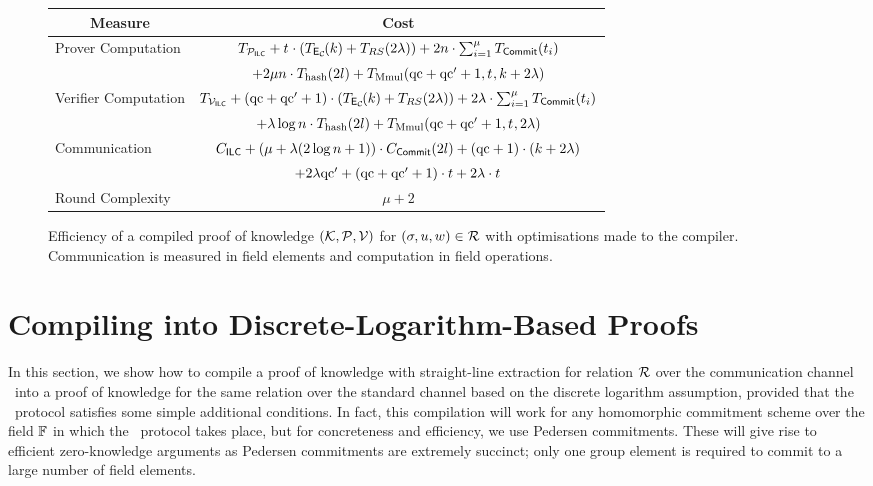 \begin{figure}[!h]
\begin{tabular}{|l|c|}
\hline
\multicolumn{1}{|c|}{\bf Measure} & {\bf Cost} \\
\hline
Prover Computation & $T_{\mathcal{P}_{\mathsf{ILC}}} + {t_{}} \cdot (T_{\mathsf{E}_{\mathcal{C}}\!}(k) + T_{RS}(2\lambda)) + 2n\cdot \sum_{i=1}^{\mu} T_{\mathsf{Commit}}(t_i)$ \\
& $+ 2\mu n \cdot T_{\text{hash}}(2l) + T_{\text{Mmul}}(\mathrm{qc}+\mathrm{qc}'+1,{t_{}},k+2\lambda)$ \\
\hline
Verifier Computation & $T_{\mathcal{V}_{\mathsf{ILC}}} + (\mathrm{qc}+\mathrm{qc}'+1)\cdot (T_{\mathsf{E}_{\mathcal{C}}\!}(k)+ T_{RS}(2\lambda)) + 2\lambda \cdot \sum_{i=1}^{\mu} T_{\mathsf{Commit}}(t_i)$ \\
& $+\lambda \log n \cdot T_{\text{hash}}(2l)+ T_{\text{Mmul}}(\mathrm{qc}+\mathrm{qc}'+1,{t_{}},2\lambda)$\\
\hline
Communication & $C_{\mathsf{ILC}} + (\mu + \lambda(2\log n+1))\cdot C_{\mathsf{Commit}}(2l) + (\mathrm{qc}+1)\cdot(k+2\lambda)$ \\
&$+ 2\lambda\mathrm{qc}'+(\mathrm{qc}+\mathrm{qc}'+1)\cdot t+ 2\lambda\cdot t$ \\
\hline
Round Complexity & $\mu + 2$ \\
\hline
\end{tabular}
\caption{Efficiency of a compiled proof of knowledge $(\mathcal{K},\mathcal{P},\mathcal{V})$ for $(\mathsf{\sigma},u,w)\in \mathcal{R}$ with optimisations made to the compiler. Communication is measured in field elements and computation in field operations.}\label{fig:IOPeff2}
\end{figure}

\section{Compiling into Discrete-Logarithm-Based Proofs}

In this section, we show how to compile a proof of knowledge with straight-line extraction for relation $\mathcal{R}$ over the communication channel \ILC\ into a proof of knowledge for the same relation over the standard channel based on the discrete logarithm assumption, provided that the \ILC\ protocol satisfies some simple additional conditions. In fact, this compilation will work for any homomorphic commitment scheme over the field $\mathbb{F}$ in which the \ILC\ protocol takes place, but for concreteness and efficiency, we use Pedersen commitments. These will give rise to efficient zero-knowledge arguments as Pedersen commitments are extremely succinct; only one group element is required to commit to a large number of field elements.

